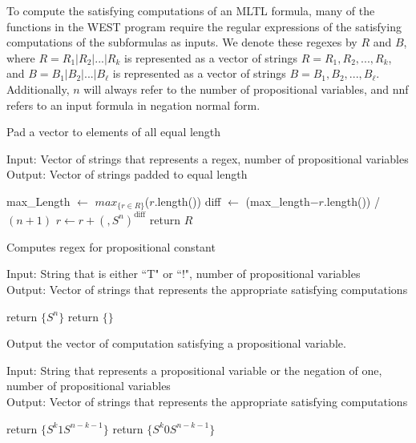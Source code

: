 \documentclass[runningheads]{llncs}
\begin{document}
To compute the satisfying computations of an MLTL formula, many of the functions in the WEST program require the regular expressions of the satisfying computations of the subformulas as inputs. We denote these regexes by $R$ and $B$, where $R = R_1 | R_2 | ... | R_k$ is represented as a vector of strings $R = {R_1, R_2, ..., R_k}$, and $B = B_1 | B_2 | ... | B_\ell$ is represented as a vector of strings $B = {B_1, B_2, ..., B_\ell}$. Additionally, $n$ will always refer to the number of propositional variables, and nnf refers to an input formula in negation normal form.
\begin{algorithm}[H]
\caption{Pad a vector to elements of all equal length}
Input: Vector of strings that represents a regex, number of propositional variables \\
Output: Vector of strings padded to equal length
\begin{algorithmic}
    \State max\_Length $\leftarrow$ $max_{\{r \in R\}}$($r$.length()) 
        \State diff $\leftarrow$ (max\_length$- r$.length()) / $(n+1)$ 
        \State  $r \leftarrow r + (,S^n)^{\text{diff}}$
    \EndFor
    \State return $R$
    
\EndProcedure
\end{algorithmic}
\end{algorithm}
\begin{algorithm}[H]
\caption{Computes regex for propositional constant}
Input: String that is either ``T" or ``!", number of propositional variables\\
Output: Vector of strings that represents the appropriate satisfying computations
\begin{algorithmic}
        \State return $\{S^n\}$ 
    \Else 
        \State return $\{\}$ 
    \EndIf
\EndProcedure
\end{algorithmic}
\end{algorithm}
\begin{algorithm}[H]
\caption{Output the vector of computation satisfying a propositional variable.}
Input: String that represents a propositional variable or the negation of one, number of propositional variables \\
Output: Vector of strings that represents the appropriate satisfying computations
\begin{algorithmic}
        \State return $\{S^k1S^{n-k-1}\}$ 
    \EndIf 
        \State return $\{S^k0S^{n-k-1}\}$ 
    \EndIf
\EndProcedure
\end{algorithmic}
\end{algorithm}
\end{document}
